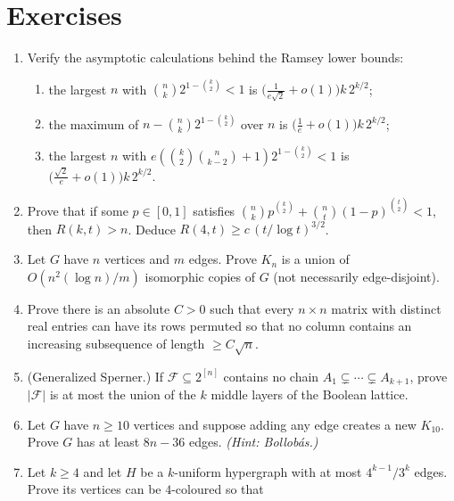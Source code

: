 \section*{Exercises}

\begin{enumerate}[itemsep=4pt]
  \item Verify the asymptotic calculations behind the Ramsey lower bounds:
        \begin{enumerate}
          \item the largest $n$ with $\binom nk 2^{1-\binom k2}<1$ is
                $\bigl(\tfrac{1}{e\sqrt2}+o(1)\bigr)k\,2^{k/2}$;
          \item the maximum of $n-\binom nk 2^{1-\binom k2}$ over $n$ is
                $\bigl(\tfrac1e+o(1)\bigr)k\,2^{k/2}$;
          \item the largest $n$ with
                $e(\binom k2\binom{n}{k-2}+1)2^{1-\binom k2}<1$ is
                $\bigl(\tfrac{\sqrt2}{e}+o(1)\bigr)k\,2^{k/2}$.
        \end{enumerate}
  \item Prove that if some $p\in[0,1]$ satisfies
        $\binom nk p^{\binom k2}+\binom nt(1-p)^{\binom t2}<1$, then
        $R(k,t)>n$. Deduce $R(4,t)\ge c\,(t/\log t)^{3/2}$.
  \item Let $G$ have $n$ vertices and $m$ edges. Prove $K_n$ is a union of
        $O(n^2(\log n)/m)$ isomorphic copies of $G$ (not necessarily
        edge-disjoint).
  \item Prove there is an absolute $C>0$ such that every $n\times n$ matrix with
        distinct real entries can have its rows permuted so that no column
        contains an increasing subsequence of length $\ge C\sqrt n$.
  \item (Generalized Sperner.) If $\mathcal F\subseteq 2^{[n]}$ contains no
        chain $A_1\subsetneq\cdots\subsetneq A_{k+1}$, prove $|\mathcal F|$ is at
        most the union of the $k$ middle layers of the Boolean lattice.
  \item Let $G$ have $n\ge10$ vertices and suppose adding any edge creates a new
        $K_{10}$. Prove $G$ has at least $8n-36$ edges. \textit{(Hint: Bollob\'as.)}
  \item Let $k\ge4$ and let $H$ be a $k$-uniform hypergraph with at most
        $4^{k-1}/3^k$ edges. Prove its vertices can be $4$-coloured so that

\end{enumerate}
